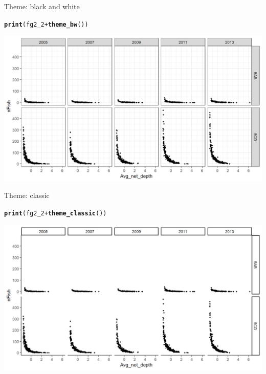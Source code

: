 \documentclass{beamer}\usepackage[]{graphicx}\usepackage[]{color}
\makeatletter
\newcommand{\hlopt}[1]{\textcolor[rgb]{0,0,0}{#1}}%
\newcommand{\hlstd}[1]{\textcolor[rgb]{0.345,0.345,0.345}{#1}}%
\newcommand{\hlkwd}[1]{\textcolor[rgb]{0.737,0.353,0.396}{\textbf{#1}}}%
\newenvironment{kframe}{%
 \def\at@end@of@kframe{}%
 \ifinner\ifhmode%
  \def\at@end@of@kframe{\end{minipage}}%
  \begin{minipage}{\columnwidth}%
 \fi\fi%
 \def\FrameCommand##1{\hskip\@totalleftmargin \hskip-\fboxsep
 \colorbox{shadecolor}{##1}\hskip-\fboxsep
     \hskip-\linewidth \hskip-\@totalleftmargin \hskip\columnwidth}%
 \MakeFramed {\advance\hsize-\width
   \@totalleftmargin\z@ \linewidth\hsize
   \@setminipage}}%
 {\par\unskip\endMakeFramed%
 \at@end@of@kframe}
\newenvironment{knitrout}{}{} %
\makeatother
\begin{document}
\begin{frame}[fragile]{Theme: black and white}
\begin{knitrout}\footnotesize
{}\color{fgcolor}\begin{kframe}
\begin{alltt}
\hlkwd{print}\hlstd{(fg2_2} \hlopt{+} \hlkwd{theme_bw}\hlstd{())}
\end{alltt}
\end{kframe}

{\centering \includegraphics[width=.9\linewidth]{figure/theme_2-1} 

}



\end{knitrout}
\end{frame}

\begin{frame}[fragile]{Theme: classic}
\begin{knitrout}\footnotesize
{}\color{fgcolor}\begin{kframe}
\begin{alltt}
\hlkwd{print}\hlstd{(fg2_2} \hlopt{+} \hlkwd{theme_classic}\hlstd{())}
\end{alltt}
\end{kframe}

{\centering \includegraphics[width=.9\linewidth]{figure/theme_3-1} 

}



\end{knitrout}
\end{frame}
\end{document}
